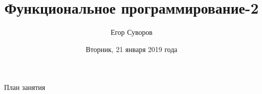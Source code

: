 \documentclass[utf8,xcolor=table]{beamer}
\title[ФП-2]{Функциональное программирование-2}
\author{Егор Суворов}
\institute[НИУ ВШЭ]{Курс <<Основы программирования>>}
\date[21.01.2020]{Вторник, 21 января 2019 года}
\begin{document}
\begin{frame}
\titlepage
\end{frame}

\begin{frame}{План занятия}
	\tableofcontents
\end{frame}







\end{document}
